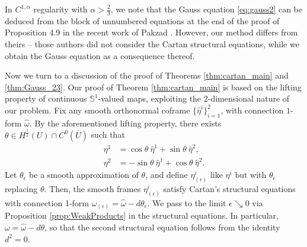 \documentclass[12pt]{article}
\theoremstyle{plain}
\numberwithin{equation}{section}
\begin{document}
In $C^{1,\alpha}$ regularity with $\alpha > \frac23$, we note that the Gauss equation \eqref{eq:gauss2} can be deduced from the block of unnumbered equations at the end of the proof of Proposition 4.9 in the recent work of Pakzad \cite{pakzad_24}. However, our method differs from theirs -- those authors did not consider the Cartan structural equations, while we obtain the Gauss equation as a consequence thereof.

Now we turn to a discussion of the proof of Theorems \ref{thm:cartan_main} and \ref{thm:Gauss_23}. Our proof of Theorem \ref{thm:cartan_main} is based on the lifting property of continuous $\mathbb{S}^1$-valued maps, exploiting the 2-dimensional nature of our problem. Fix any smooth orthonormal coframe $\{\hat\eta^i\}_{i=1}^2$, with connection $1$-form $\hat\omega$. By the aforementioned lifting property, there exists $\theta \in H^{\frac12}(U) \cap C^0(\overline U)$ such that
\begin{align*}
    \eta^1 &= \cos\theta~ \hat\eta^1 + \sin\theta~ \hat\eta^2,\\
    \eta^2 &= -\sin\theta~\hat\eta^1 + \cos\theta~ \hat\eta^2.
\end{align*}
Let $\theta_\epsilon$ be a smooth approximation of $\theta$, and define $\eta^i_{(\epsilon)}$ like $\eta^i$ but with $\theta_\epsilon$ replacing $\theta$. Then, the smooth frames $\eta^i_{(\epsilon)}$ satisfy Cartan's structural equations with connection 1-form $\omega_{(\epsilon)} = \hat{\omega} - d\theta_\epsilon$. We pass to the limit $\epsilon \searrow 0$ via Proposition \ref{prop:WeakProducts} in the structural equations. In particular, $\omega = \hat\omega - d\theta$, so that the second structural equation follows from the identity $d^2 = 0$.
\end{document}
